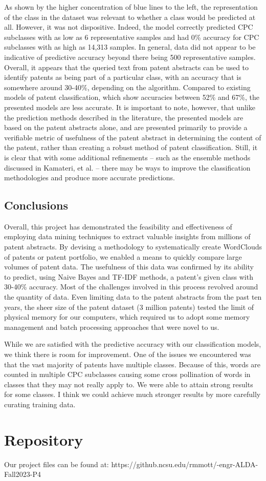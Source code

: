 \documentclass{article}
\begin{document}
As shown by the higher concentration of blue lines to the left, the representation of the class in the dataset was relevant to whether a class would be predicted at all.  However, it was not dispositive.  Indeed, the model correctly predicted CPC subclasses with as low as 6 representative samples and had 0\% accuracy for CPC subclasses with as high as 14,313 samples.  In general, data did not appear to be indicative of predictive accuracy beyond there being 500 representative samples. Overall, it appears that the queried text from patent abstracts can be used to identify patents as being part of a particular class, with an accuracy that is somewhere around 30-40\%, depending on the algorithm.  Compared to existing models of patent classification, which show accuracies between 52\% and 67\%\cite{article:kamateri}, the presented models are less accurate.  It is important to note, however, that unlike the prediction methods described in the literature, the presented models are based on the patent abstracts alone, and are presented primarily to provide a verifiable metric of usefulness of the patent abstract in determining the content of the patent, rather than creating a robust method of patent classification.  Still, it is clear that with some additional refinements – such as the ensemble methods discussed in Kamateri, et al. – there may be ways to improve the classification methodologies and produce more accurate predictions.

\subsection{Conclusions}
Overall, this project has demonstrated the feasibility and effectiveness of employing data mining techniques to extract valuable insights from millions of patent abstracts.  By devising a methodology to systematically create WordClouds of patents or patent portfolio, we enabled a means to quickly compare large volumes of patent data.  The usefulness of this data was confirmed by its ability to predict, using Naive Bayes and TF-IDF methods, a patent’s given class with 30-40\% accuracy. Most of the challenges involved in this process revolved around the quantity of data.  Even limiting data to the patent abstracts from the past ten years, the sheer size of the patent dataset (3 million patents) tested the limit of physical memory for our computers, which required us to adopt some memory management and batch processing approaches that were novel to us.  

While we are satisfied with the predictive accuracy with our classification models, we think there is room for improvement. One of the issues we encountered was that the vast majority of patents have multiple classes.  Because of this, words are counted in multiple CPC subclasses causing some cross pollination of words in classes that they may not really apply to. We were able to attain strong results for some classes. I think we could achieve much stronger results by more carefully curating training data. 

\section{Repository}
Our project files can be found at: https://github.ncsu.edu/rmmott/-engr-ALDA-Fall2023-P4

 



\end{document}
